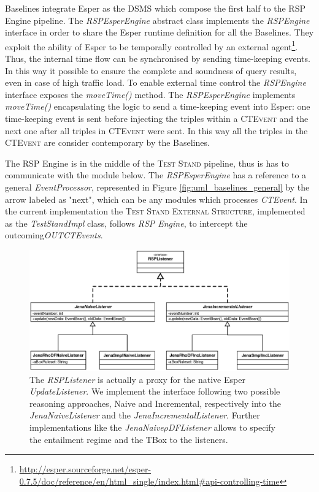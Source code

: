 \name Baselines integrate Esper as the DSMS which compose the first half to the RSP Engine pipeline.  The \textit{RSPEsperEngine} abstract class implements the \textit{RSPEngine} interface in order to share the Esper runtime definition for all the Baselines.  They exploit the ability of Esper to be temporally controlled by an external agent\footnote{\url{http://esper.sourceforge.net/esper-0.7.5/doc/reference/en/html_single/index.html#api-controlling-time}}. Thus, the internal time flow can be synchronised by sending time-keeping events. In this way it possible to ensure the complete and soundness of query results, even in case of high traffic load. To enable external time control the \textit{RSPEngine} interface exposes the \textit{moveTime()} method.  The \textit{RSPEsperEngine} implements \textit{moveTime()} encapsulating the logic to send a time-keeping event into Esper: one time-keeping event is sent before injecting the triples within a \textsc{CTEvent} and the next one after all triples in \textsc{CTEvent} were sent. In this way all the triples in the \textsc{CTEvent} are consider contemporary by the Baselines. 

The RSP Engine is in the middle of the \textsc{Test Stand} pipeline, thus is has to communicate with the module below. The \textit{RSPEsperEngine} has a reference to a general \textit{EventProcessor}, represented in Figure \ref{fig:uml_baselines_general}  by the arrow labeled as "next", which can be any modules which processes \textit{CTEvent}. In the current implementation the \textsc{Test Stand External Structure}, implemented as the \textit{TestStandImpl} class, follows \textit{RSP Engine}, to intercept the outcoming\textit{OUTCTEvents}.

\begin{figure}[tbh]
  \centering
	\includegraphics[width=\linewidth]{images/uml_baselines_listener}
	\caption[\textit{RSPListener} Implementations - UML Schema]{The \textit{RSPListener} is actually a proxy for the native Esper \textit{UpdateListener}. We implement the interface following two possible reasoning approaches, Naive and Incremental, respectively into the  \textit{JenaNaiveListener} and the \textit{JenaIncrementalListener}. Further implementations like the \textit{JenaNaive$\rho$DFListener} allows to specify the entailment regime and the TBox to the listeners.} 
  	\label{fig:uml_baselines_listener}
\end{figure}

